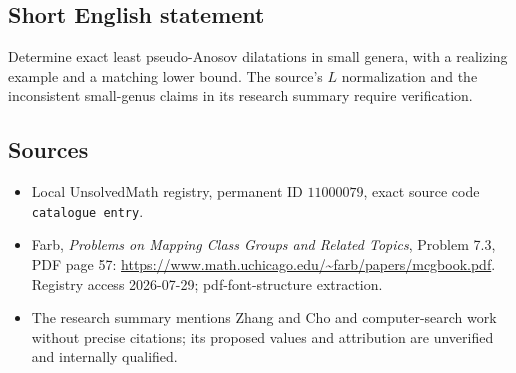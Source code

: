 \documentclass[11pt]{article}
\begin{document}
\subsection{Short English statement}
Determine exact least pseudo-Anosov dilatations in small genera, with a realizing example and a matching lower bound. The source's \(L\) normalization and the inconsistent small-genus claims in its research summary require verification.
\subsection{Sources}
\begin{itemize}
\item Local UnsolvedMath registry, permanent ID \(11000079\), exact source code \texttt{catalogue entry}.
\item Farb, \emph{Problems on Mapping Class Groups and Related Topics}, Problem 7.3, PDF page 57: \url{https://www.math.uchicago.edu/~farb/papers/mcgbook.pdf}. Registry access 2026-07-29; pdf-font-structure extraction.
\item The research summary mentions Zhang and Cho and computer-search work without precise citations; its proposed values and attribution are unverified and internally qualified.
\end{itemize}
\end{document}
